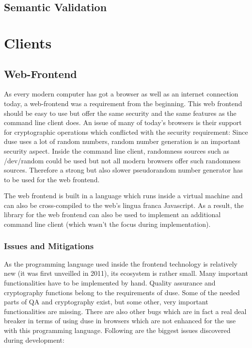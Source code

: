\subsection{Semantic Validation}

\section{Clients}

\subsection{Web-Frontend}

As every modern computer has got a browser as well as an internet connection today,
a web-frontend was a requirement from the beginning. This web frontend should be
easy to use but offer the same security and the same features as the command line
client does. An issue of many of today's browsers is their support for
cryptographic operations which conflicted with the security requirement:
Since duse uses a lot of random numbers, random number generation is an important
security aspect. Inside the command line client, randomness sources such as
/dev/random could be used but not all modern browsers offer such randomness
sources. Therefore a strong but also slower pseudorandom number generator has
to be used for the web frontend.

The web frontend is built in a language which runs inside a virtual machine and
can also be cross-compiled to the web's lingua franca Javascript. As a result,
the library for the web frontend can also be used to implement an
additional command line client (which wasn't the focus during implementation).

\subsubsection{Issues and Mitigations}

As the programming language used inside the frontend technology is relatively
new (it was first unveilled in 2011), its ecosystem is rather small. Many
important functionalities have to be implemented by hand. Quality assurance
and cryptography functions belong to the requirements of duse. Some of the
needed parts of QA and cryptography exist, but some other, very important
functionalities are missing. There are also other bugs which are in fact a
real deal breaker in terms of using duse in browsers which are not enhanced
for the use with this programming language. Following are the biggest issues
discovered during development:


